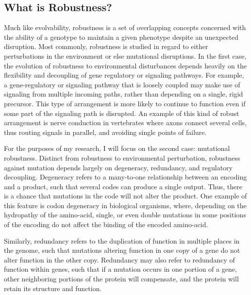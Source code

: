 \documentclass[PhD]{msu-thesis}
\begin{document}
\subsection{What is Robustness?}
Much like evolvability, robustness is a set of overlapping concepts concerned with the ability of a genotype to maintain a given phenotype despite an unexpected disruption\cite{kitano_biological_2004,visser_perspective:_2003}. Most commonly, robustness is studied in regard to either perturbations in the environment or else mutational disruptions. In the first case, the evolution of robustness to environmental disturbances depends heavily on the flexibility and decoupling of gene regulatory or signaling pathways\cite{kirschner_evolvability_1998}. For example, a gene-regulatory or signaling pathway that is loosely coupled may make use of signaling from multiple incoming paths, rather than depending on a single, rigid precursor. This type of arrangement is more likely to continue to function even if some part of the signaling path is disrupted. An example of this kind of robust arrangement is nerve conduction in vertebrates where axons connect several cells, thus routing signals in parallel, and avoiding single points of failure\cite{kirschner_evolvability_1998}.

For the purposes of my research, I will focus on the second case: mutational robustness. Distinct from robustness to environmental perturbation, robustness against mutation depends largely on degeneracy, redundancy, and regulatory decoupling\cite{kitano_biological_2004}. Degeneracy refers to a many-to-one relationship between an encoding and a product, such that several codes can produce a single output. Thus, there is a chance that mutations in the code will not alter the product. One example of this feature is codon degeneracy in biological organisms, where, depending on the hydropathy of the amino-acid, single, or even double mutations in some positions of the encoding do not affect the binding of the encoded amino-acid\cite{whitacre_degeneracy:_2010}.

Similarly, redundancy refers to the duplication of function in multiple places in the genome, such that mutations altering function in one copy of a gene do not alter function in the other copy. Redundancy may also refer to redundancy of function within genes, such that if a mutation occurs in one portion of a gene, other neighboring portions of the protein will compensate, and the protein will retain its structure and function.\cite{wagner_distributed_2005} 
\end{document}
